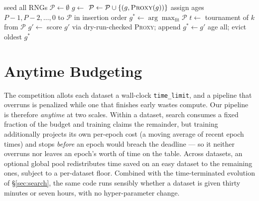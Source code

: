 \documentclass[10pt,twocolumn]{article}
\newcommand{\code}[1]{\texttt{\small #1}}
\begin{document}
\begin{algorithm}[t]
\caption{Repair-guarded aging evolution (abridged)}
\label{alg:evo}
\begin{algorithmic}[1]
\State seed all RNGs 
\State $\mathcal{P}\gets\emptyset$
  \State $g\gets$ 
   $\mathcal{P}\gets\mathcal{P}\cup\{(g,\textsc{Proxy}(g))\}$ \EndIf
\EndWhile
\State assign ages $P{-}1,P{-}2,\ldots,0$ to $\mathcal{P}$ in insertion order 
\State $g^*\gets\arg\max_{\text{fit}}\mathcal{P}$ 
  \State $t\gets$ tournament of $k$ from $\mathcal{P}$
  \State $g'\gets$ 
  \State score $g'$ via dry-run-checked \textsc{Proxy}; append
   $g^*\gets g'$ \EndIf {}
  \State age all; evict oldest
\EndWhile
\State \Return $g^*$ 
\end{algorithmic}
\end{algorithm}

\section{Anytime Budgeting}
\label{sec:anytime}

The competition allots each dataset a wall-clock \code{time\_limit}, and a
pipeline that overruns is penalized while one that finishes early wastes
compute. Our pipeline is therefore \emph{anytime} at two scales. Within a
dataset, search consumes a fixed fraction of the budget and training claims the
remainder, but training additionally projects its own per-epoch cost (a moving
average of recent epoch times) and stops \emph{before} an epoch would breach the
deadline --- so it neither overruns nor leaves an epoch's worth of time on the
table. Across datasets, an optional global pool redistributes time saved on an
easy dataset to the remaining ones, subject to a per-dataset floor. Combined
with the time-terminated evolution of \S\ref{sec:search}, the same code runs
sensibly whether a dataset is given thirty minutes or seven hours, with no
hyper-parameter change.
\end{document}
